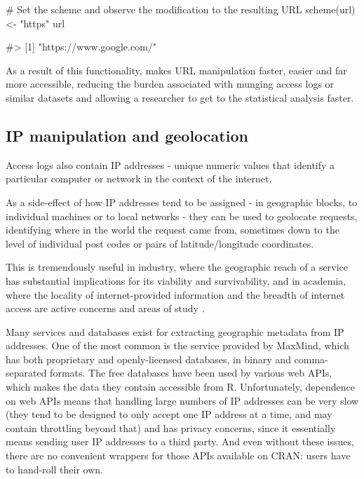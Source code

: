 \begin{Schunk}
\begin{Sinput}
# Set the scheme and observe the modification to the resulting URL
scheme(url) <- "https"
url
\end{Sinput}
\begin{Soutput}
#> [1] "https://www.google.com/"
\end{Soutput}
\end{Schunk}

As a result of this functionality,  makes URL manipulation
faster, easier and far more accessible, reducing the burden associated
with munging access logs or similar datasets and allowing a researcher
to get to the statistical analysis faster.

\subsection{IP manipulation and
geolocation}\label{ip-manipulation-and-geolocation}

Access logs also contain IP addresses - unique numeric values that
identify a particular computer or network in the context of the
internet.

As a side-effect of how IP addresses tend to be assigned - in geographic
blocks, to individual machines or to local networks - they can be used
to geolocate requests, identifying where in the world the request came
from, sometimes down to the level of individual post codes or pairs of
latitude/longitude coordinates.

This is tremendously useful in industry, where the geographic reach of a
service has substantial implications for its viability and
survivability, and in academia, where the locality of internet-provided
information and the breadth of internet access are active concerns and
areas of study \citep{barriers}.

Many services and databases exist for extracting geographic metadata
from IP addresses. One of the most common is the service provided by
MaxMind, which has both proprietary and openly-licensed databases, in
binary and comma-separated formats. The free databases have been used by
various web APIs, which makes the data they contain accessible from R.
Unfortunately, dependence on web APIs means that handling large numbers
of IP addresses can be very slow (they tend to be designed to only
accept one IP address at a time, and may contain throttling beyond that)
and has privacy concerns, since it essentially means sending user IP
addresses to a third party. And even without these issues, there are no
convenient wrappers for those APIs available on CRAN: users have to
hand-roll their own.

